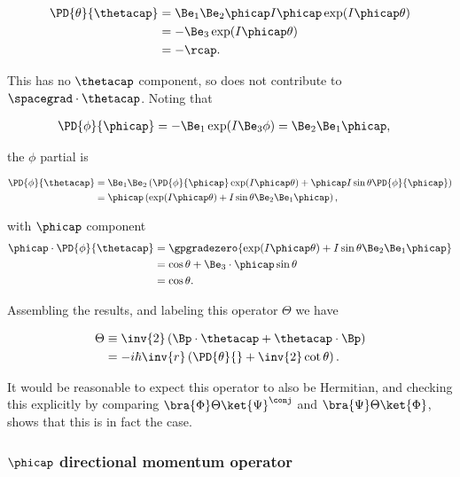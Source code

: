 \begin{align*}
\PD{\theta}{\thetacap} 
&=
\Be_1 \Be_2 \phicap I \phicap \exp( I \phicap \theta) \\
&=
-\Be_3 \exp( I \phicap \theta) \\
&=
- \rcap.
\end{align*}

This has no $\thetacap$ component, so does not contribute to $\spacegrad \cdot \thetacap$.  Noting that

\begin{align*}
\PD{\phi}{\phicap} &= -\Be_1 \exp( I \Be_3 \phi ) = \Be_2 \Be_1 \phicap,
\end{align*}

the $\phi$ partial is

\begin{align*}
\PD{\phi}{\thetacap} &=
\Be_1 \Be_2 \left( 
\PD{\phi}{\phicap} \exp( I \phicap \theta )
+\phicap I \sin\theta \PD{\phi}{\phicap} 
\right) \\
&=
\phicap 
\left( 
\exp( I \phicap \theta )
+I \sin\theta \Be_2 \Be_1 \phicap
\right),
\end{align*}

with $\phicap$ component
\begin{align*}
\phicap \cdot \PD{\phi}{\thetacap} &=
\gpgradezero{
\exp( I \phicap \theta )
+I \sin\theta \Be_2 \Be_1 \phicap } \\
&=
\cos\theta + \Be_3 \cdot \phicap \sin\theta \\
&=
\cos\theta.
\end{align*}

Assembling the results, and labeling this operator $\Theta$ we have

\begin{align*}
\Theta &\equiv \inv{2} \left( \Bp \cdot \thetacap + \thetacap \cdot \Bp \right)  \\
&=
-i \hbar \inv{r} \left( \PD{\theta}{} + \inv{2} \cot\theta \right).
\end{align*}

It would be reasonable to expect this operator to also be Hermitian, and checking this explicitly by comparing
$\bra{\Phi} \Theta \ket{\Psi}^\conj$ and $\bra{\Psi} \Theta \ket{\Phi}$, shows that this is in fact the case.

\subsubsection{$\phicap$ directional momentum operator}


